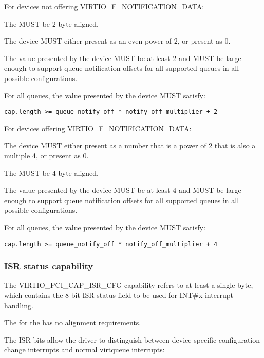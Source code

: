 For devices not offering VIRTIO_F_NOTIFICATION_DATA:

The  MUST be 2-byte aligned.

The device MUST either present  as an even power of 2,
or present  as 0.

The value  presented by the device MUST be at least 2
and MUST be large enough to support queue notification offsets
for all supported queues in all possible configurations.

For all queues, the value  presented by the device MUST satisfy:
\begin{lstlisting}
cap.length >= queue_notify_off * notify_off_multiplier + 2
\end{lstlisting}

For devices offering VIRTIO_F_NOTIFICATION_DATA:

The device MUST either present  as a
number that is a power of 2 that is also a multiple 4,
or present  as 0.

The  MUST be 4-byte aligned.

The value  presented by the device MUST be at least 4
and MUST be large enough to support queue notification offsets
for all supported queues in all possible configurations.

For all queues, the value  presented by the device MUST satisfy:
\begin{lstlisting}
cap.length >= queue_notify_off * notify_off_multiplier + 4
\end{lstlisting}

\subsubsection{ISR status capability}\label{sec:Virtio Transport Options / Virtio Over PCI Bus / PCI Device Layout / ISR status capability}

The VIRTIO_PCI_CAP_ISR_CFG capability
refers to at least a single byte, which contains the 8-bit ISR status field
to be used for INT\#x interrupt handling.

The  for the  has no alignment requirements.

The ISR bits allow the driver to distinguish between device-specific configuration
change interrupts and normal virtqueue interrupts:

